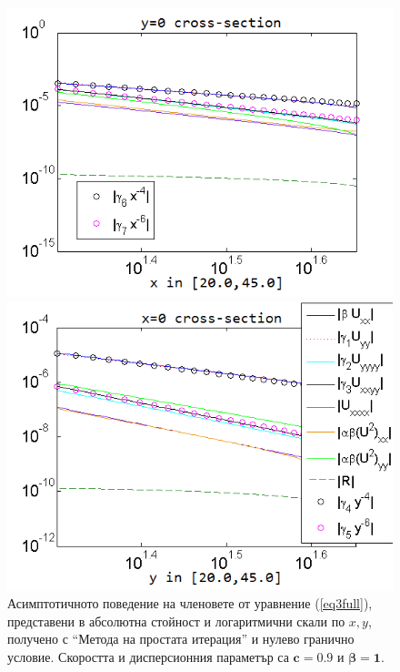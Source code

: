 \documentclass{article}
\newcommand{\rf}[1]{(\ref{#1})}
\begin{document}
\begin{figure}[ht]	
	\begin{minipage}[b]{0.95\linewidth}
		\raggedleft
		\includegraphics[width=\linewidth]{AssymptForEachTerm/bt1_c010_090/ChristovIC_AlongX_50_ZB2_bt1_c090_h020_O(h^6).png}
	\end{minipage}
	\begin{minipage}[b]{0.95\linewidth}
		 \raggedright
		\includegraphics[width=\linewidth]{AssymptForEachTerm/bt1_c010_090/ChristovIC_AlongY_50_ZB2_bt1_c090_h020_O(h^6).png}
	\end{minipage}
	\caption{Асимптотичното поведение на членовете от уравнение \rf{eq3full}, представени в абсолютна стойност и логаритмични скали по $x,y$, получено с ``Метода на простата итерация'' и нулево гранично условие. Скоростта и дисперсионния параметър са $\boldsymbol{c=0.9}$ и $\boldsymbol{\beta = 1}$. }
	\label{fig:assympt_beta1c09}
\end{figure}
\end{document}
